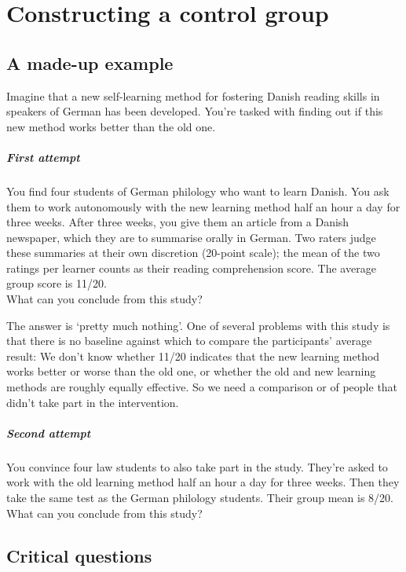 \chapter{Constructing a control group}\label{ch:randomisation}

\section{A made-up example}\label{sec:beispiel}
Imagine that a new self-learning method for fostering
Danish reading skills in speakers of German has been developed.
You're tasked with finding out if this new method works
better than the old one.

\paragraph{First attempt} 
You find four students of German philology
who want to learn Danish. You ask them to work
autonomously with the new learning method
half an hour a day for three weeks. After three weeks,
you give them an article from a Danish newspaper,
which they are to summarise orally in German.
Two raters judge these summaries at their own discretion
(20-point scale); the mean of the two ratings per
learner counts as their reading comprehension score.
The average group score is 11/20.\\
What can you conclude from this study?

The answer is `pretty much nothing'.
One of several problems with this study is that 
there is no baseline against which to compare the participants'
average result: We don't know whether 11/20 indicates that the
new learning method works better or worse than the old one, or whether
the old and new learning methods are roughly equally effective.
So we need a comparison or 
of people that didn't take part in the intervention.

\paragraph{Second attempt}
You convince four law students to also take part in the study.
They're asked to work with the old learning method
half an hour a day for three weeks.
Then they take the same test as the German philology students.
Their group mean is 8/20.\\
What can you conclude from this study?

\clearpage

\section{Critical questions}\label{sec:validitaet}%

